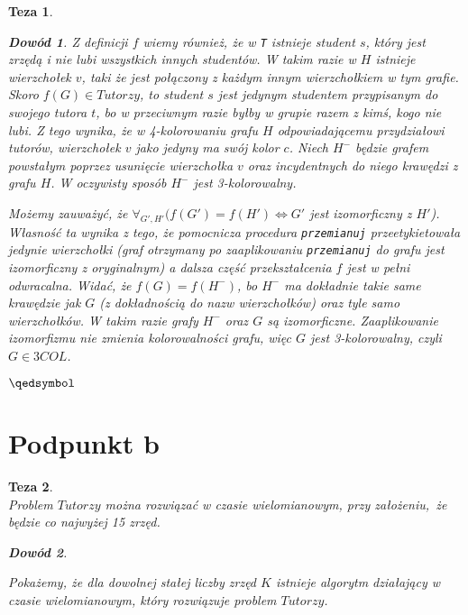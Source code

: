 \documentclass[12pt]{article}
\newtheorem*{theorem*}{Teza}
\newtheorem*{proof*}{Dowód}
\begin{document}
\begin{titlepage}
\begin{theorem*}
\begin{proof*}
Z definicji $f$ wiemy również, że w \texttt{T} istnieje student $s$, który jest \textit{zrzędą} i nie lubi wszystkich innych studentów. W takim razie w $H$ istnieje wierzchołek $v$, taki że jest połączony z każdym innym wierzchołkiem w tym grafie. Skoro $f(G) \in Tutorzy$, to student $s$ jest jedynym studentem przypisanym do swojego tutora $t$, bo w przeciwnym razie byłby w grupie razem z kimś, kogo nie lubi. Z tego wynika, że w 4-kolorowaniu grafu $H$ odpowiadającemu przydziałowi tutorów, wierzchołek $v$ jako jedyny ma swój kolor $c$. Niech $H^-$ będzie grafem powstałym poprzez usunięcie wierzchołka $v$ oraz incydentnych do niego krawędzi z grafu $H$. W oczywisty sposób $H^-$ jest 3-kolorowalny.

Możemy zauważyć, że $\forall_{G', H'}(f(G') = f(H') \Leftrightarrow G'$ jest 
izomorficzny z $H'$). Własność ta wynika z tego, że pomocnicza procedura 
\texttt{przemianuj} przeetykietowała jedynie wierzchołki (graf otrzymany po 
zaaplikowaniu \texttt{przemianuj} do grafu jest izomorficzny z oryginalnym) a 
dalsza część przekształcenia $f$ jest w pełni odwracalna. Widać, że $f(G) 
= f(H^-)$, bo $H^-$ ma dokładnie takie same krawędzie jak $G$ (z dokładnością 
do nazw wierzchołków) oraz tyle samo wierzchołków. W takim razie grafy $H^-$ oraz $G$ są izomorficzne. Zaaplikowanie izomorfizmu nie zmienia kolorowalności grafu, więc $G$ jest 3-kolorowalny, czyli $G \in 3COL$.
\begin{flushright}
    $\qedsymbol$
\end{flushright}

\end{proof*} \end{theorem*}

\hrulefill

\section{Podpunkt b}

\begin{theorem*}\,\\\normalfont
Problem $Tutorzy$ można rozwiązać w czasie wielomianowym, przy założeniu, że 
będzie co najwyżej 15 zrzęd.

\begin{proof*}\,\\\normalfont

Pokażemy, że dla dowolnej stałej liczby zrzęd $K$ istnieje algorytm działający 
w czasie wielomianowym, który rozwiązuje problem $Tutorzy$.


\end{proof*}
\end{theorem*}
\end{titlepage}
\end{document}

